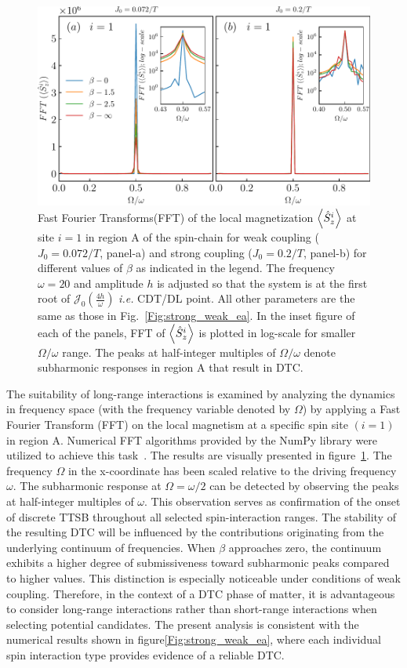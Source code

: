\documentclass[12pt]{iopart}
\begin{document}
\begin{figure}[h]
	\centering
	\includegraphics[width=10.cm]{figure5.pdf}
	\caption{Fast Fourier Transforms(FFT) of the local magnetization $\expval{\hat{S}_z^i}$ at site $i=1$ in region A of the spin-chain for weak coupling ($J_0 = 0.072/T$, panel-a) and strong coupling ($J_0 = 0.2/T$, panel-b) for different values of $\beta$ as indicated in the legend. The frequency $\omega =20$ and amplitude $h$ is adjusted so that the system is at the first root of $\mathcal{J}_0\left(\frac{4h}{\omega}\right)$ \textit{i.e.} CDT/DL point. All other parameters are the same as those in Fig.~\ref{Fig:strong_weak_ea}. In the inset figure of each of the panels, FFT of $\expval{\hat{S}_z^i}$ is plotted in log-scale for smaller $\Omega/\omega$ range. The peaks at half-integer multiples of $\Omega/\omega$ denote subharmonic responses in region A that result in DTC.}
	\label{Fig:sz_single}
\end{figure}

The suitability of long-range interactions is examined by analyzing the dynamics in frequency space (with the frequency variable denoted by $\Omega$) by applying a Fast Fourier Transform (FFT) on the local magnetism at a specific spin site $(i=1)$ in region A. Numerical FFT algorithms provided by the NumPy library were utilized to achieve this task~\cite{harris2020array}. The results are visually presented in figure~\ref{Fig:sz_single}.  The frequency $\Omega$ in the x-coordinate has been scaled relative to the driving frequency $\omega$. The subharmonic response at $\Omega=\omega/2$ can be detected by observing the peaks at half-integer multiples of $\omega$. This observation serves as confirmation of the onset of discrete TTSB throughout all selected spin-interaction ranges. The stability of the resulting DTC will be influenced by the contributions originating from the underlying continuum of frequencies. When $\beta$ approaches zero, the continuum exhibits a higher degree of submissiveness toward subharmonic peaks compared to higher values. This distinction is especially noticeable under conditions of weak coupling. Therefore, in the context of a DTC phase of matter, it is advantageous to consider long-range interactions rather than short-range interactions when selecting potential candidates. The present analysis is consistent with the numerical results shown in figure\ref{Fig:strong_weak_ea}, where each individual spin interaction type provides evidence of a reliable DTC.
\end{document}
